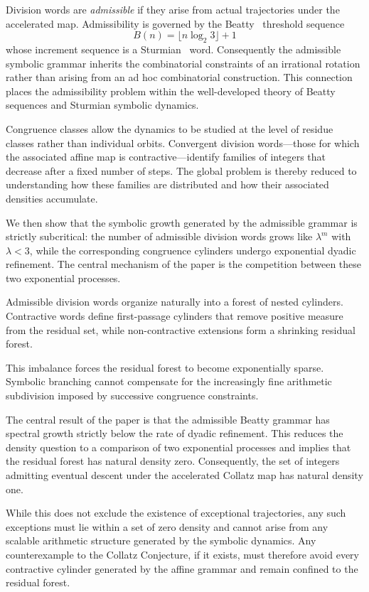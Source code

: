 \documentclass[12pt, oneside]{article}
\numberwithin{equation}{section}
\theoremstyle{definition}
\theoremstyle{plain}
\theoremstyle{remark}
\begin{document}
Division words are \emph{admissible} if they arise from actual trajectories under the
accelerated map. Admissibility is governed by the Beatty~\cite{Graham1994} threshold sequence
\[
B(n) = \lfloor n \log_2 3 \rfloor + 1
\]
whose increment sequence is a Sturmian~\cite{Lothaire2002} word. Consequently the admissible
symbolic grammar inherits the combinatorial constraints of an irrational rotation rather than
arising from an ad hoc combinatorial construction.  This connection places the admissibility
problem within the well-developed theory of Beatty sequences and Sturmian symbolic dynamics.

Congruence classes allow the dynamics to be studied at the level of residue classes
rather than individual orbits. Convergent division words—those for which the associated
affine map is contractive—identify families of integers that decrease after a fixed
number of steps. The global problem is thereby reduced to understanding how these
families are distributed and how their associated densities accumulate.

We then show that the symbolic growth generated by the admissible grammar is strictly subcritical:
the number of admissible division words grows like \(\lambda^m\) with \(\lambda<3\), while the 
corresponding congruence cylinders undergo exponential dyadic refinement. The central mechanism
of the paper is the competition between these two exponential processes.

Admissible division words organize naturally into a forest of nested cylinders. Contractive
words define first-passage cylinders that remove positive measure from the residual set,
while non-contractive extensions form a shrinking residual forest.

This imbalance forces the residual forest to become exponentially sparse. Symbolic branching
cannot compensate for the increasingly fine arithmetic subdivision imposed by successive
congruence constraints.

The central result of the paper is that the admissible Beatty grammar has spectral growth
strictly below the rate of dyadic refinement. This reduces the density question to a comparison
of two exponential processes and implies that the residual forest has natural density zero.
Consequently, the set of integers admitting eventual descent under the accelerated Collatz map
has natural density one.

While this does not exclude the existence of exceptional trajectories, any such
exceptions must lie within a set of zero density and cannot arise from any scalable
arithmetic structure generated by the symbolic dynamics. Any counterexample to the Collatz
Conjecture, if it exists, must therefore avoid every contractive cylinder generated by the
affine grammar and remain confined to the residual forest.
\end{document}
